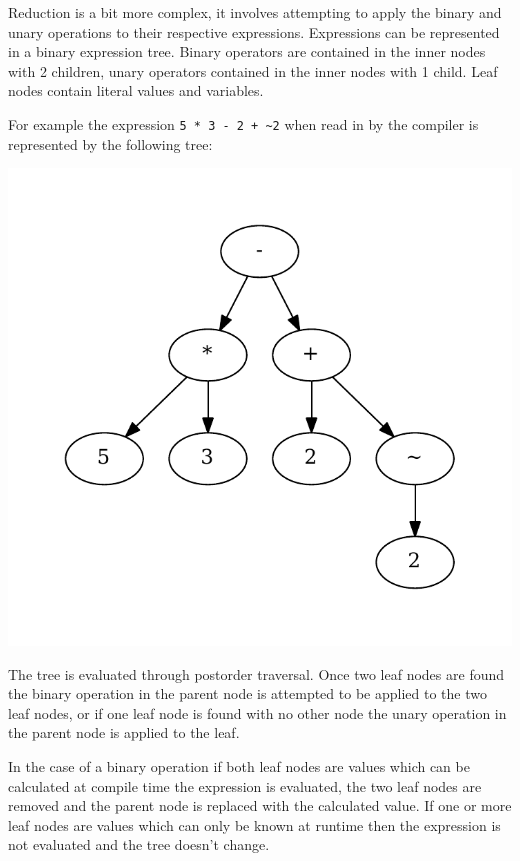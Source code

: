 Reduction is a bit more complex, it involves attempting to apply the binary
and unary operations to their respective expressions. Expressions can be
represented in a binary expression tree. Binary operators are contained in
the inner nodes with 2 children, unary operators contained in the inner
nodes with 1 child. Leaf nodes contain literal values and variables.

For example the expression \texttt{5 * 3 - 2 + \textasciitilde2} when read in by the
compiler is represented by the following tree:

\begin{center}
\includegraphics[scale=0.5]{graphs/impleval.pdf}
\end{center}


The tree is evaluated through
postorder traversal. Once two leaf nodes are found the binary operation in the parent node
is attempted to be applied to the two leaf nodes, or if one leaf node is found
with no other node the unary operation in the parent node is applied
to the leaf.  

In the case of a binary operation if both leaf nodes are values which
can be calculated at compile time the expression is evaluated, the two leaf nodes
are removed and the parent node is replaced with the calculated value. If one or
more leaf nodes are values which can only be known at runtime then the expression is
not evaluated and the tree doesn't change. 

